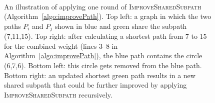 \documentclass[reqno]{amsart}
\begin{document}
\begin{figure}[tbp]
	\begin{minipage}{0.45\textwidth}
	\begin{center}
		
	\end{center}
	\end{minipage}
	\hfil
	\begin{minipage}{0.45\textwidth}
	\begin{center}
		
	\end{center}
	\end{minipage}\hfil
	\\[4mm]
	\begin{minipage}{0.45\textwidth}
	\begin{center}
		
	\end{center}
	\end{minipage}
	\hfil
	\begin{minipage}{0.45\textwidth}
	\begin{center}
		
	\end{center}
	\end{minipage}\hfil
	\caption{An illustration of applying one round of \textsc{ImproveSharedSubpath} (Algorithm~\ref{algo:improvePath}). Top left: a graph in which the two paths $P_i$ and $P_j$ shown in blue and green share the subpath (7,11,15). Top right: after calculating a shortest path from 7 to 15 for the combined weight (lines 3--8 in Algorithm~\ref{algo:improvePath}), the blue path contains the circle (6,7,6). Bottom left: this circle gets removed from the blue path. Bottom right:
	an updated shortest green path results in a new shared subpath that
	could be further improved by applying \textsc{ImproveSharedSubpath} recursively.}
	\label{fig:recursiveImprove}
\end{figure}
\end{document}
